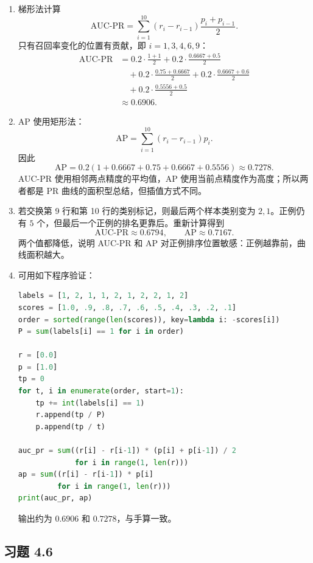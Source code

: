 \documentclass[UTF8,a4paper,12pt]{ctexart}
\begin{document}
\begin{enumerate}
  \item 梯形法计算
  \[
      \mathrm{AUC\text{-}PR}
      =\sum_{i=1}^{10}(r_i-r_{i-1})\frac{p_i+p_{i-1}}{2}.
  \]
  只有召回率变化的位置有贡献，即 $i=1,3,4,6,9$：
  \begin{align*}
      \mathrm{AUC\text{-}PR}
      &=0.2\cdot\frac{1+1}{2}
        +0.2\cdot\frac{0.6667+0.5}{2}\\
      &\quad+0.2\cdot\frac{0.75+0.6667}{2}
        +0.2\cdot\frac{0.6667+0.6}{2}\\
      &\quad+0.2\cdot\frac{0.5556+0.5}{2}\\
      &\approx 0.6906.
  \end{align*}

  \item AP 使用矩形法：
  \[
      \mathrm{AP}=\sum_{i=1}^{10}(r_i-r_{i-1})p_i.
  \]
  因此
  \[
      \mathrm{AP}
      =0.2(1+0.6667+0.75+0.6667+0.5556)
      \approx 0.7278.
  \]
  AUC-PR 使用相邻两点精度的平均值，AP 使用当前点精度作为高度；所以两者都是 PR 曲线的面积型总结，但插值方式不同。

  \item 若交换第 9 行和第 10 行的类别标记，则最后两个样本类别变为 $2,1$。正例仍有 $5$ 个，但最后一个正例的排名更靠后。重新计算得到
  \[
      \mathrm{AUC\text{-}PR}\approx 0.6794,\qquad
      \mathrm{AP}\approx 0.7167.
  \]
  两个值都降低，说明 AUC-PR 和 AP 对正例排序位置敏感：正例越靠前，曲线面积越大。

  \item 可用如下程序验证：
\begin{lstlisting}[language=Python]
labels = [1, 2, 1, 1, 2, 1, 2, 2, 1, 2]
scores = [1.0, .9, .8, .7, .6, .5, .4, .3, .2, .1]
order = sorted(range(len(scores)), key=lambda i: -scores[i])
P = sum(labels[i] == 1 for i in order)

r = [0.0]
p = [1.0]
tp = 0
for t, i in enumerate(order, start=1):
    tp += int(labels[i] == 1)
    r.append(tp / P)
    p.append(tp / t)

auc_pr = sum((r[i] - r[i-1]) * (p[i] + p[i-1]) / 2
             for i in range(1, len(r)))
ap = sum((r[i] - r[i-1]) * p[i]
         for i in range(1, len(r)))
print(auc_pr, ap)
\end{lstlisting}
  输出约为 $0.6906$ 和 $0.7278$，与手算一致。
\end{enumerate}

\subsection*{习题 4.6}
\end{document}
